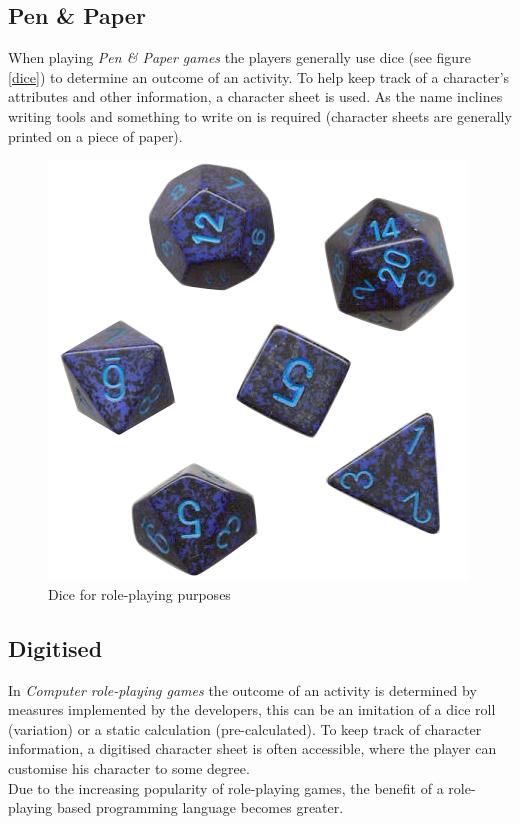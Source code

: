 \subsection*{Pen \& Paper}
When playing \emph{Pen \& Paper games} the players generally use dice (see figure \vref{dice}) to determine an outcome of an activity. To help keep track of a character's attributes and other information, a character sheet is used.
As the name inclines writing tools and something to write on is required (character sheets are generally printed on a piece of paper).
\begin{figure}[!h]
\centering
\includegraphics[scale=0.4]{img/rpgdice.png}
\caption{Dice for role-playing purposes}
\label{dice}
\end{figure}
\subsection*{Digitised}
In \emph{Computer role-playing games} the outcome of an activity is determined by measures implemented by the developers, this can be an imitation of a dice roll (variation) or a static calculation (pre-calculated).
To keep track of character information, a digitised character sheet is often accessible, where the player can customise his character to some degree.\\
Due to the increasing popularity of role-playing games, the benefit of a role-playing based programming language becomes greater.
\pagebreak


